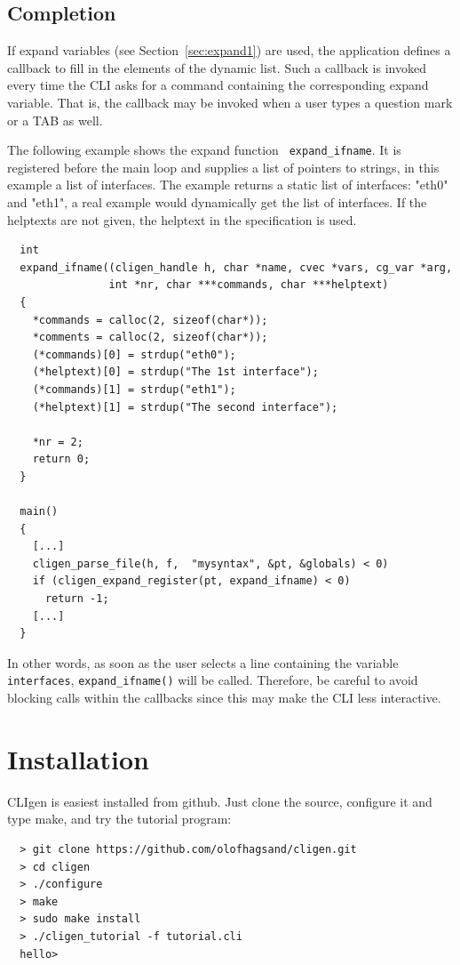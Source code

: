 \documentclass[a4paper, 10pt] {article}
\begin{document}
\subsection{Completion}
\label{sec:expand}

If expand variables (see Section~\ref{sec:expand1}) are used, the
application defines a callback to fill in the elements of the dynamic
list. Such a callback is invoked every time the CLI asks for a command
containing the corresponding expand variable. That is, the callback
may be invoked when a user types a question mark or a TAB as well.

The following example shows the expand function {\tt
  expand\_ifname}. It is registered before the main loop and supplies
a list of pointers to strings, in this example a list of
interfaces. The example returns a static list of interfaces: "eth0"
and "eth1", a real example would dynamically get the list of
interfaces. If the helptexts are not given, the helptext in the specification is used.


\begin{verbatim}
  int 
  expand_ifname((cligen_handle h, char *name, cvec *vars, cg_var *arg, 
                int *nr, char ***commands, char ***helptext)
  {
    *commands = calloc(2, sizeof(char*)); 
    *comments = calloc(2, sizeof(char*)); 
    (*commands)[0] = strdup("eth0");
    (*helptext)[0] = strdup("The 1st interface");
    (*commands)[1] = strdup("eth1");
    (*helptext)[1] = strdup("The second interface");

    *nr = 2;
    return 0;
  }

  main()
  {   
    [...]
    cligen_parse_file(h, f,  "mysyntax", &pt, &globals) < 0)
    if (cligen_expand_register(pt, expand_ifname) < 0)
      return -1;
    [...]
  }
\end{verbatim}

In other words, as soon as the user selects a line containing the
variable {\tt interfaces}, {\tt expand\_ifname()} will be
called. Therefore, be careful to avoid blocking calls within the
callbacks since this may make the CLI less interactive.

\section{Installation}

CLIgen is easiest installed from github. Just clone the source,
configure it and type make, and try the tutorial program:

\begin{verbatim}
  > git clone https://github.com/olofhagsand/cligen.git
  > cd cligen
  > ./configure
  > make
  > sudo make install
  > ./cligen_tutorial -f tutorial.cli
  hello>
\end{verbatim}
\end{document}
